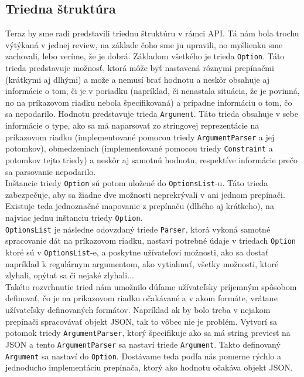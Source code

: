 \documentclass{article}
\begin{document}
\subsection{Triedna štruktúra}
Teraz by sme radi predstavili triednu štruktúru v rámci API. Tá nám bola trochu výtýkaná v jednej review, na základe čoho sme ju upravili, no myšlienku sme zachovali, lebo veríme, že je dobrá. Základom všetkého je trieda \texttt{Option}. Táto trieda predstavuje možnosť, ktorá môže byť nastavená rôznymi prepínačmi (krátkymi aj dlhými) a može a nemusí brať hodnotu a neskôr obsahuje aj informácie o tom, či je v poriadku (napríklad, či nenastala situácia, že je povinná, no na príkazovom riadku nebola špecifikovaná) a prípadne informáciu o tom, čo sa nepodarilo. Hodnotu predstavuje trieda \texttt{Argument}. Táto trieda obsahuje v sebe informácie o type, ako sa má naparsovať zo stringovej reprezentácie na príkazovom riadku (implementované pomocou triedy \texttt{ArgumentParser} a jej potomkov), obmedzeniach (implementované pomocou triedy \texttt{Constraint} a potomkov tejto triedy) a neskôr aj samotnú hodnotu, respektíve informácie prečo sa parsovanie nepodarilo.\\
Inštancie triedy \texttt{Option} sú potom uložené do \texttt{OptionsList}-u. Táto trieda zabezpečuje, aby sa žiadne dve možnosti neprekrývali v ani jednom prepínači. Existuje teda jednoznačné mapovanie z prepínaču (dlhého aj krátkeho), na najviac jednu inštanciu triedy \texttt{Option}.\\
\texttt{OptionsList} je následne odovzdaný triede \texttt{Parser}, ktorá vykoná samotné spracovanie dát na príkazovom riadku, nastaví potrebné údaje v triedach \texttt{Option} ktoré sú v \texttt{OptionsList}-e, a poskytne užívateľovi možnosti, ako sa dostať napríklad k regulárnym argumentom, ako vytiahnuť, všetky možnosti, ktoré zlyhali, opýtať sa či nejaké zlyhali...\\
Takéto rozvrhnutie tried nám umožnilo dúfame užívateľsky príjemným spôsobom definovať, čo je na príkazovom riadku očakávané a v akom formáte, vrátane užívateľsky definovaných formátov. Napríklad ak by bolo treba v nejakom prepínači spracovávať objekt JSON, tak to vôbec nie je problém. Vytvorí sa potomok triedy \texttt{ArgumentParser}, ktorý špecifikuje ako sa má string previesť na JSON a tento \texttt{ArgumentParser} sa nastaví triede \texttt{Argument}. Takto definovaný \texttt{Argument} sa nastaví do \texttt{Option}. Dostávame teda podľa nás pomerne rýchlo a jednoducho implementáciu prepínača, ktorý ako hodnotu očakáva objekt JSON.
\end{document}
